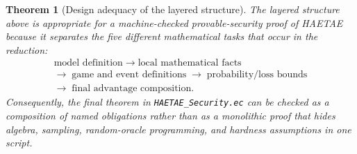 \documentclass[11pt]{report}
\newcommand{\file}[1]{\nolinkurl{#1}}
\theoremstyle{definition}
\theoremstyle{plain}
\newtheorem{formaltheorem}{Theorem}[chapter]
\theoremstyle{definition}
\begin{document}
\begin{formaltheorem}[Design adequacy of the layered structure]
The layered structure above is appropriate for a machine-checked
provable-security proof of HAETAE because it separates the five different
mathematical tasks that occur in the reduction:
\[
  \begin{gathered}
    \text{model definition}
    \;\longrightarrow\;
    \text{local mathematical facts}\\
    \longrightarrow\;
    \text{game and event definitions}
    \;\longrightarrow\;
    \text{probability/loss bounds}\\
    \longrightarrow\;
    \text{final advantage composition}.
  \end{gathered}
\]
Consequently, the final theorem in \file{HAETAE\_Security.ec} can be checked as
a composition of named obligations rather than as a monolithic proof that hides
algebra, sampling, random-oracle programming, and hardness assumptions in one
script.
\end{formaltheorem}
\end{document}
